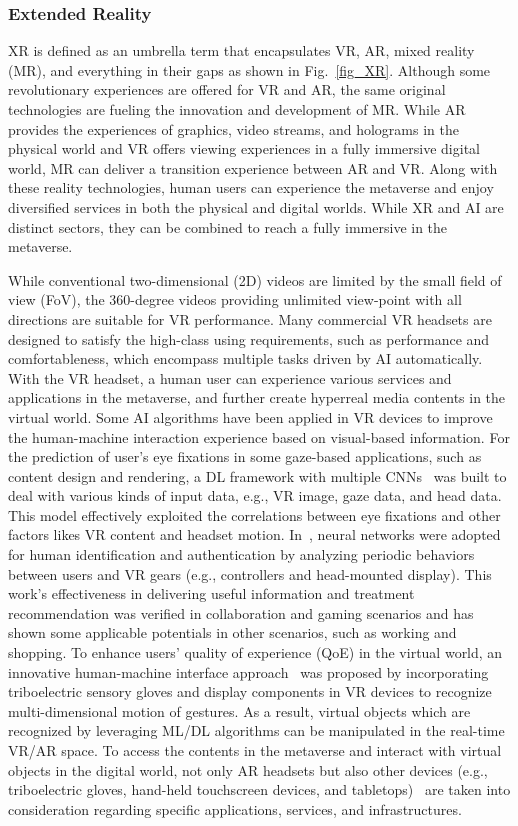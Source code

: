 \documentclass[journal]{IEEEtran}
\begin{document}
\subsubsection{Extended Reality}
XR is defined as an umbrella term that encapsulates VR, AR, mixed reality (MR), and everything in their gaps as shown in Fig.~\ref{fig_XR}. 
Although some revolutionary experiences are offered for VR and AR, the same original technologies are fueling the innovation and development of MR.  
While AR provides the experiences of graphics, video streams, and holograms in the physical world and VR offers viewing experiences in a fully immersive digital world, MR can deliver a transition experience between AR and VR.
Along with these reality technologies, human users can experience the metaverse and enjoy diversified services in both the physical and digital worlds. 
While XR and AI are distinct sectors, they can be combined to reach a fully immersive in the metaverse.  



While conventional two-dimensional (2D) videos are limited by the small field of view (FoV), the 360-degree videos providing unlimited view-point with all directions are suitable for VR performance. 
Many commercial VR headsets are designed to satisfy the high-class using requirements, such as performance and comfortableness, which encompass multiple tasks driven by AI automatically. 
With the VR headset, a human user can experience various services and applications in the metaverse, and further create hyperreal media contents in the virtual world.
Some AI algorithms have been applied in VR devices to improve the human-machine interaction experience based on visual-based information.
For the prediction of user’s eye fixations in some gaze-based applications, such as content design and rendering, a DL framework with multiple CNNs~\cite{hu2021fixationnet} was built to deal with various kinds of input data, e.g., VR image, gaze data, and head data.
This model effectively exploited the correlations between eye fixations and other factors likes VR content and headset motion. 
In~\cite{pham2018human}, neural networks were adopted for human identification and authentication by analyzing periodic behaviors between users and VR gears (e.g., controllers and head-mounted display).
This work's effectiveness in delivering useful information and treatment recommendation was verified in collaboration and gaming scenarios and has shown some applicable potentials in other scenarios, such as working and shopping.
To enhance users' quality of experience (QoE) in the virtual world, an innovative human-machine interface approach~\cite{zhu2020sensory} was proposed by incorporating triboelectric sensory gloves and display components in VR devices to recognize multi-dimensional motion of gestures.
As a result, virtual objects which are recognized by leveraging ML/DL algorithms can be manipulated in the real-time VR/AR space.
To access the contents in the metaverse and interact with virtual objects in the digital world, not only AR headsets but also other devices (e.g., triboelectric gloves, hand-held touchscreen devices, and tabletops)~\cite{kataoka2019new} are taken into consideration regarding specific applications, services, and infrastructures.
\end{document}
